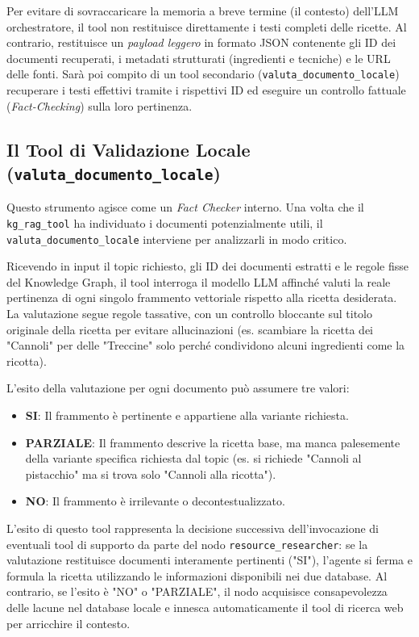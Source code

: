\documentclass[11pt, a4paper]{article}
\begin{document}
Per evitare di sovraccaricare la memoria a breve termine (il contesto) dell'LLM orchestratore, il tool non restituisce direttamente i testi completi delle ricette. Al contrario, restituisce un \textit{payload leggero} in formato JSON contenente gli ID dei documenti recuperati, i metadati strutturati (ingredienti e tecniche) e le URL delle fonti. Sarà poi compito di un tool secondario (\texttt{valuta\_documento\_locale}) recuperare i testi effettivi tramite i rispettivi ID ed eseguire un controllo fattuale (\textit{Fact-Checking}) sulla loro pertinenza.

\subsection{Il Tool di Validazione Locale (\texttt{valuta\_documento\_locale})}

Questo strumento agisce come un \textit{Fact Checker} interno. Una volta che il \texttt{kg\_rag\_tool} ha individuato i documenti potenzialmente utili, il \texttt{valuta\_documento\_locale} interviene per analizzarli in modo critico. 

Ricevendo in input il topic richiesto, gli ID dei documenti estratti e le regole fisse del Knowledge Graph, il tool interroga il modello LLM affinché valuti la reale pertinenza di ogni singolo frammento vettoriale rispetto alla ricetta desiderata. La valutazione segue regole tassative, con un controllo bloccante sul titolo originale della ricetta per evitare allucinazioni (es. scambiare la ricetta dei "Cannoli" per delle "Treccine" solo perché condividono alcuni ingredienti come la ricotta).

L'esito della valutazione per ogni documento può assumere tre valori:
\begin{itemize}
    \item \textbf{SI}: Il frammento è pertinente e appartiene alla variante richiesta.
    \item \textbf{PARZIALE}: Il frammento descrive la ricetta base, ma manca palesemente della variante specifica richiesta dal topic (es. si richiede "Cannoli al pistacchio" ma si trova solo "Cannoli alla ricotta").
    \item \textbf{NO}: Il frammento è irrilevante o decontestualizzato.
\end{itemize}

L'esito di questo tool rappresenta la decisione successiva dell'invocazione di eventuali tool di supporto da parte del nodo \texttt{resource\_researcher}: se la valutazione restituisce documenti interamente pertinenti ("SI"), l'agente si ferma e formula la ricetta utilizzando le informazioni disponibili nei due database. Al contrario, se l'esito è "NO" o "PARZIALE", il nodo acquisisce consapevolezza delle lacune nel database locale e innesca automaticamente il tool di ricerca web per arricchire il contesto.
\end{document}
